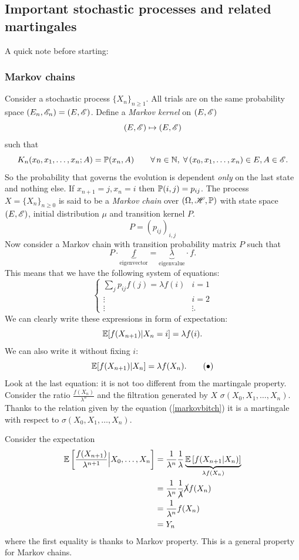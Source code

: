\documentclass{report}
\begin{document}
\subsection{Important stochastic processes and related martingales}
A quick note before starting:
\subsubsection*{Markov chains}
Consider a stochastic process ${\{X_{n}\}}_{n\geq 1}$. All trials are on the same probability space $(E_n,\mathscr{E}_{n})=(E,\mathscr{E})$. Define a \emph{Markov kernel} on $(E,\mathscr{E})$
\[(E,\mathscr{E})\mapsto(E,\mathscr{E})\]
such that
\[K_{n}(x_{0},x_{1},\ldots,x_{n};A)=\mathbb{P}(x_{n},A)\qquad\forall\, n\in\mathbb{N},\;\forall\,(x_{0},x_{1},\ldots,x_{n})\in E,A\in\mathscr{E}.\]
So the probability that governs the evolution is dependent \textit{only} on the last state and nothing else. If $x_{n+1}=j,x_{n}=i$ then $\mathbb{P}(i,j)=p_{ij}$. The process $X={\{X_{n}\}}_{n\geq0}$ is said to be a \emph{Markov chain} over $(\Omega,\mathscr{H},\mathbb{P})$ with state space $(E,\mathscr{E})$, initial distribution $\mu$ and transition kernel $P$.\\
\[P={(p_{ij})}_{i,j}\]
Now consider a Markov chain with transition probability matrix $P$ such that
\[P\cdot\underbrace{f}_{{\text{eigenvector}}}=\underbrace{\lambda}_{{\text{eigenvalue}}}\cdot f.\]
This means that we have the following system of equations:
\[\begin{cases}
	\sum_{j} p_{ij}f(j)=\lambda f(i)&i=1\\
	\vdots&i=2\\
	\vdots&\vdots.
\end{cases}\]
We can clearly write these expressions in form of expectation:
\[\mathbb{E}[f(X_{n+1})|X_{n}=i]=\lambda f(i).\]
We can also write it without fixing $i$:
\begin{equation}
	\mathbb{E}[f(X_{n+1})|X_{n}]=\lambda f(X_{n}).\tag{$\bullet$}\label{markovbitch}
\end{equation}
Look at the last equation: it is not too different from the martingale property. Consider the ratio $\frac{f(X_{n})}{\lambda^{n}}$ and the filtration generated by $X$ $\sigma(X_{0},X_{1},\ldots,X_{n})$. Thanks to the relation given by the equation (\ref{markovbitch}) it is a martingale with respect to $\sigma(X_{0},X_{1},\ldots,X_{n})$.
\begin{fancyproof}
	Consider the expectation 
\begin{align*}
		\mathbb{E}\left[\frac{f(X_{n+1})}{\lambda^{n+1}}\Big|X_0,\ldots,X_n\right]&=\frac{1}{\lambda^{n}}\frac{1}{\lambda}\underbrace{\mathbb{E}\left[f(X_{n+1}|X_{n})\right]}_{\lambda f(X_{n})}\\
		&=\frac{1}{\lambda^{n}}\frac{1}{\cancel{\lambda}}\cancel{\lambda}f(X_{n})\\
		&=\frac{1}{\lambda^{n}}f(X_{n})\\
		&=Y_{n}
\end{align*}
where the first equality is thanks to Markov property. This is a general property for Markov chains.
\end{fancyproof}
\end{document}
